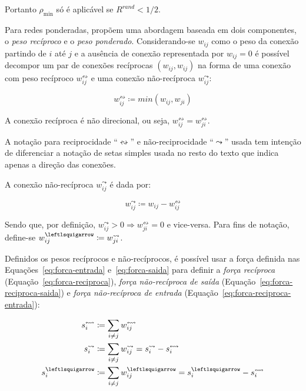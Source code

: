 \documentclass[12pt,a4paper]{article}
\theoremstyle{hypo}
\newcommand{\defn}{\coloneqq} %
\newcommand{\recin}[1]{#1^\leftlsquigarrow} %
\newcommand{\recout}[1]{#1^\leadsto} %
\newcommand{\recboth}[1]{#1^\leftrightsquigarrow} %
\begin{document}
Portanto $\rho_\text{min}$ só é aplicável se $R^\textit{rand} < 1 / 2$.

Para redes ponderadas,  propõem uma abordagem baseada em dois componentes, o \textit{peso recíproco} e o \textit{peso ponderado}. Considerando-se $w_{ij}$ como o peso da conexão partindo de $i$ até $j$ e a ausência de conexão representada por $w_{ij} = 0$ é possível decompor um par de conexões recíprocas $(w_{ij}, w_{ij})$ na forma de uma conexão com peso recíproco $w^\leftrightsquigarrow_{ij}$ e uma conexão não-recíproca $w^\leadsto_{ij}$:

\begin{equation}
\recboth{w}_{ij} \defn min(w_{ij},w_{ji})
\end{equation}

A conexão recíproca é não direcional, ou seja, $\recboth{w}_{ij} = \recboth{w}_{ji}$.

A notação para reciprocidade \enquote{$\leftrightsquigarrow$} e não-reciprocidade \enquote{$\leadsto$} usada tem intenção de diferenciar a notação de setas simples usada no resto do texto que indica apenas a direção das conexões.

A conexão não-recíproca $\recout{w}_{ij}$ é dada por:
 
\begin{equation}
\recout{w}_{ij} \defn w_{ij} - \recboth{w}_{ij}
\end{equation}

Sendo que, por definição, $\recout{w}_{ij} > 0 \Rightarrow \recboth{w}_{ji} = 0$ e vice-versa. Para fins de notação, define-se $\recin{w}_{ij} \defn \recout{w}_{ji}$.

Definidos os pesos recíprocos e não-recíprocos, é possível usar a força definida nas Equações~\ref{eq:forca-entrada} e~\ref{eq:forca-saida} para definir a \textit{força recíproca} (Equação~\ref{eq:forca-reciproca}), \textit{força não-recíproca de saída}  (Equação~\ref{eq:forca-reciproca-saida}) e \textit{força não-recíproca de entrada}  (Equação~\ref{eq:forca-reciproca-entrada}):

\begin{align}
\recboth{s}_i &\defn \sum_{i \neq j} \recboth{w}_{ij} \label{eq:forca-reciproca} \\
\recout{s}_i  &\defn \sum_{i \neq j} \recout{w}_{ij} = \recout{s}_i - \recboth{s}_i \label{eq:forca-reciproca-saida} \\
\recin{s}_i   &\defn \sum_{i \neq j} \recin{w}_{ij} = \recin{s}_i - \recboth{s}_i \label{eq:forca-reciproca-entrada}
\end{align}
\end{document}
